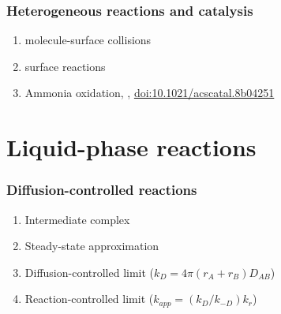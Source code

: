 \documentclass[11pt]{article}
\begin{document}
\subsubsection{Heterogeneous reactions and catalysis}
\label{sec:orgd80a702}
\begin{enumerate}
\item molecule-surface collisions
\item surface reactions
\item Ammonia oxidation, , \href{http://pubs.acs.org/doi/10.1021/acscatal.8b04251}{doi:10.1021/acscatal.8b04251}
\end{enumerate}

\section{Liquid-phase reactions}
\label{sec:org198a7f0}
\subsubsection{Diffusion-controlled reactions}
\label{sec:org411fe4c}
\begin{enumerate}
\item Intermediate complex
\item Steady-state approximation
\item Diffusion-controlled limit (\(k_D = 4\pi (r_A + r_B) D_{AB}\))
\item Reaction-controlled limit (\(k_{app}=(k_D/k_{-D})k_r\))
\end{enumerate}
\end{document}
